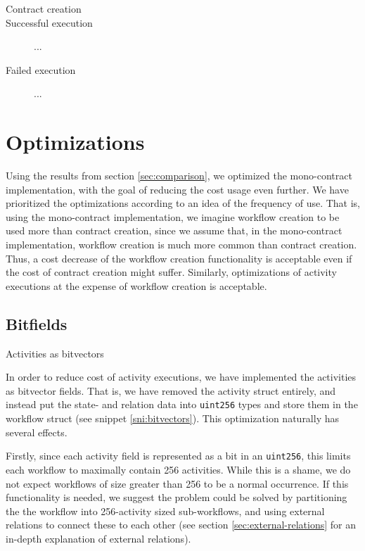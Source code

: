 \documentclass{article}
\begin{document}
	\begin{description}
		\item[Contract creation]
		\item[Successful execution] ...
		\item[Failed execution] ... 
	\end{description}

	\section{Optimizations}
		Using the results from section \ref{sec:comparison}, we optimized the mono-contract implementation, with the goal of reducing the cost usage even further.
		We have prioritized the optimizations according to an idea of the frequency of use.
		That is, using the mono-contract implementation, we imagine workflow creation to be used more than contract creation, since we assume that, in the mono-contract implementation, workflow creation is much more common than contract creation. 
		Thus, a cost decrease of the workflow creation functionality is acceptable even if the cost of contract creation might suffer. 
		Similarly, optimizations of activity executions at the expense of workflow creation is acceptable.

		\subsection{Bitfields}

		\begin{snippet}[ht!]
			\centering
			
		 	\caption[Activities as bitvectors]
		 	{Activities as bitvectors}
		 	\label{sni:bitvectors}
		\end{snippet}

		In order to reduce cost of activity executions, we have implemented the activities as bitvector fields. 
		That is, we have removed the activity struct entirely, and instead put the state- and relation data into \texttt{uint256} types and store them in the workflow struct (see snippet \ref{sni:bitvectors}).
		This optimization naturally has several effects.

		Firstly, since each activity field is represented as a bit in an \texttt{uint256}, this limits each workflow to maximally contain 256 activities. 
		While this is a shame, we do not expect workflows of size greater than 256 to be a normal occurrence.
		If this functionality is needed, we suggest the problem could be solved by partitioning the the workflow into 256-activity sized sub-workflows, and using external relations to connect these to each other (see section \ref{sec:external-relations} for an in-depth explanation of external relations).
\end{document}
